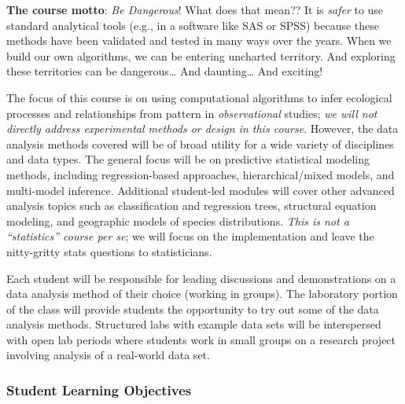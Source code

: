 \documentclass[]{article}
\begin{document}
\textbf{The course motto}: \emph{Be Dangerous}! What does that mean?? It
is \emph{safer} to use standard analytical tools (e.g., in a software
like SAS or SPSS) because these methods have been validated and tested
in many ways over the years. When we build our own algorithms, we can be
entering uncharted territory. And exploring these territories can be
dangerous\ldots{} And daunting\ldots{} And exciting!

The focus of this course is on using computational algorithms to infer
ecological processes and relationships from pattern in
\emph{observational} studies; \emph{we will not directly address
experimental methods or design in this course}. However, the data
analysis methods covered will be of broad utility for a wide variety of
disciplines and data types. The general focus will be on predictive
statistical modeling methods, including regression-based approaches,
hierarchical/mixed models, and multi-model inference. Additional
student-led modules will cover other advanced analysis topics such as
classification and regression trees, structural equation modeling, and
geographic models of species distributions. \emph{This is not a
``statistics'' course per se}; we will focus on the implementation and
leave the nitty-gritty stats questions to statisticians.

Each student will be responsible for leading discussions and
demonstrations on a data analysis method of their choice (working in
groups). The laboratory portion of the class will provide students the
opportunity to try out some of the data analysis methods. Structured
labs with example data sets will be interspersed with open lab periods
where students work in small groups on a research project involving
analysis of a real-world data set.

\subsubsection{Student Learning
Objectives}\label{student-learning-objectives}
\end{document}
